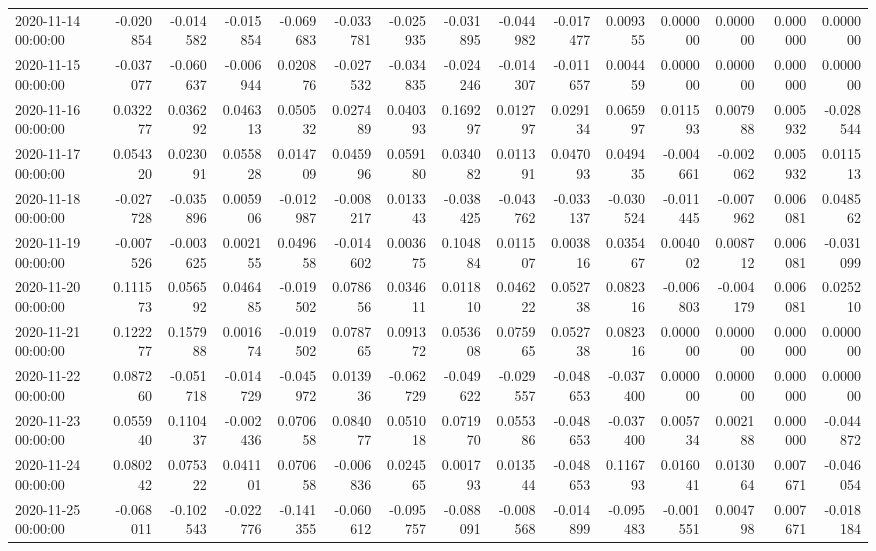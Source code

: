\begin{tabular}{lrrrrrrrrrrrrrr}
2020-11-14 00:00:00 & -0.020854 & -0.014582 & -0.015854 & -0.069683 & -0.033781 & -0.025935 & -0.031895 & -0.044982 & -0.017477 & 0.009355 & 0.000000 & 0.000000 & 0.000000 & 0.000000 \\
2020-11-15 00:00:00 & -0.037077 & -0.060637 & -0.006944 & 0.020876 & -0.027532 & -0.034835 & -0.024246 & -0.014307 & -0.011657 & 0.004459 & 0.000000 & 0.000000 & 0.000000 & 0.000000 \\
2020-11-16 00:00:00 & 0.032277 & 0.036292 & 0.046313 & 0.050532 & 0.027489 & 0.040393 & 0.169297 & 0.012797 & 0.029134 & 0.065997 & 0.011593 & 0.007988 & 0.005932 & -0.028544 \\
2020-11-17 00:00:00 & 0.054320 & 0.023091 & 0.055828 & 0.014709 & 0.045996 & 0.059180 & 0.034082 & 0.011391 & 0.047093 & 0.049435 & -0.004661 & -0.002062 & 0.005932 & 0.011513 \\
2020-11-18 00:00:00 & -0.027728 & -0.035896 & 0.005906 & -0.012987 & -0.008217 & 0.013343 & -0.038425 & -0.043762 & -0.033137 & -0.030524 & -0.011445 & -0.007962 & 0.006081 & 0.048562 \\
2020-11-19 00:00:00 & -0.007526 & -0.003625 & 0.002155 & 0.049658 & -0.014602 & 0.003675 & 0.104884 & 0.011507 & 0.003816 & 0.035467 & 0.004002 & 0.008712 & 0.006081 & -0.031099 \\
2020-11-20 00:00:00 & 0.111573 & 0.056592 & 0.046485 & -0.019502 & 0.078656 & 0.034611 & 0.011810 & 0.046222 & 0.052738 & 0.082316 & -0.006803 & -0.004179 & 0.006081 & 0.025210 \\
2020-11-21 00:00:00 & 0.122277 & 0.157988 & 0.001674 & -0.019502 & 0.078765 & 0.091372 & 0.053608 & 0.075965 & 0.052738 & 0.082316 & 0.000000 & 0.000000 & 0.000000 & 0.000000 \\
2020-11-22 00:00:00 & 0.087260 & -0.051718 & -0.014729 & -0.045972 & 0.013936 & -0.062729 & -0.049622 & -0.029557 & -0.048653 & -0.037400 & 0.000000 & 0.000000 & 0.000000 & 0.000000 \\
2020-11-23 00:00:00 & 0.055940 & 0.110437 & -0.002436 & 0.070658 & 0.084077 & 0.051018 & 0.071970 & 0.055386 & -0.048653 & -0.037400 & 0.005734 & 0.002188 & 0.000000 & -0.044872 \\
2020-11-24 00:00:00 & 0.080242 & 0.075322 & 0.041101 & 0.070658 & -0.006836 & 0.024565 & 0.001793 & 0.013544 & -0.048653 & 0.116793 & 0.016041 & 0.013064 & 0.007671 & -0.046054 \\
2020-11-25 00:00:00 & -0.068011 & -0.102543 & -0.022776 & -0.141355 & -0.060612 & -0.095757 & -0.088091 & -0.008568 & -0.014899 & -0.095483 & -0.001551 & 0.004798 & 0.007671 & -0.018184 \\

\end{tabular}
